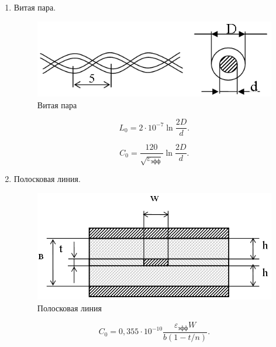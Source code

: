 \documentclass[unicode, 12pt, a4paper, oneside]{article}
\begin{document}
\begin{enumerate}
\item Витая пара.\nopagebreak

\begin{minipage}{\linewidth}
	\begin{figure}
	\centering
	\includegraphics[width=0.9\linewidth]{71_vit_pair.png}
	\caption{Витая пара}
	\end{figure}
	
	\begin{equation}
	L_0 = 2 \cdot 10^{-7} \ln \dfrac{2D}{d}.
	\end{equation}

	\begin{equation}
	C_0 = \dfrac{120}{\sqrt{\varepsilon_\text{эфф}}} \ln \dfrac{2D}{d}.
	\end{equation}
\end{minipage}
\vspace{1em}

\item Полосковая линия.\nopagebreak

\begin{minipage}{\linewidth}
	\begin{figure}
	\centering
	\includegraphics[width=\linewidth]{71_polos_line.png}
	\caption{Полосковая линия}
	\end{figure}
	
	\begin{equation}
	C_0 = 0,355 \cdot 10^{-10} \dfrac{\varepsilon_\text{эфф} W}{b (1 - t/n)}.
	\end{equation}


\end{minipage}
\end{enumerate}
\end{document}
